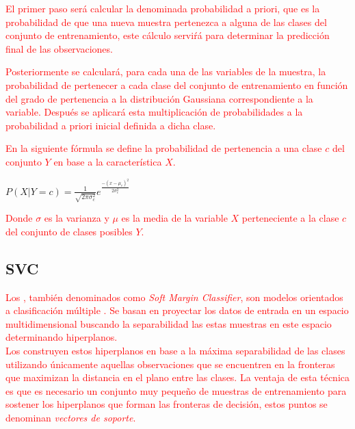         \textcolor{red}{El primer paso será calcular la denominada probabilidad a priori, que es la probabilidad de que una nueva muestra pertenezca a alguna de las clases del conjunto de entrenamiento, este cálculo serviŕá para determinar la predicción final de las observaciones.}

        \textcolor{red}{Posteriormente se calculará, para cada una de las variables de la muestra, la probabilidad de pertenecer a cada clase del conjunto de entrenamiento en función del grado de pertenencia a la distribución Gaussiana correspondiente a la variable. Después se aplicará esta multiplicación de probabilidades a la probabilidad a priori inicial definida a dicha clase.}

        \textcolor{red}{En la siguiente fórmula se define la probabilidad de pertenencia a una clase $c$ del conjunto $Y$ en base a la característica $X$.}

        \begin{center}
            $ P(X|Y = c) = \frac{1}{\sqrt{2 \pi \sigma^{2}_{c}}} e^{\frac{- (x - \mu_c)^2}{2 \sigma^{2}_{c}}}$
        \end{center}

        \textcolor{red}{Donde $\sigma$ es la varianza y $\mu$ es la media de la variable $X$ perteneciente a la clase $c$ del conjunto de clases posibles $Y$.}

        \subsection {SVC}


             \textcolor{red}{Los , también denominados como \textit{Soft Margin Classifier}, son modelos orientados a clasificación múltiple \cite{SVM}. Se basan en proyectar los datos de entrada en un espacio multidimensional buscando la separabilidad las estas muestras en este espacio determinando hiperplanos.}\\

            \textcolor{red}{Los  construyen estos hiperplanos en base a la máxima separabilidad de las clases utilizando únicamente aquellas observaciones que se encuentren en la fronteras que maximizan la distancia en el plano entre las clases. La ventaja de esta técnica es que es necesario un conjunto muy pequeño de muestras de entrenamiento para sostener los hiperplanos que forman las fronteras de decisión, estos puntos se denominan \textit{vectores de soporte}.}\\

